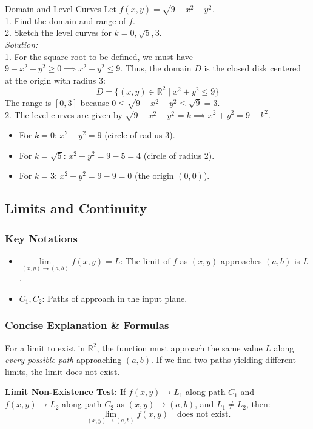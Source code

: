 \documentclass[11pt]{article}
\begin{document}
\begin{examplebox}{Domain and Level Curves}
    Let $f(x,y) = \sqrt{9 - x^2 - y^2}$.\\
    1. Find the domain and range of $f$.\\
    2. Sketch the level curves for $k = 0, \sqrt{5}, 3$.\\
    \textit{Solution:}\\
    1. For the square root to be defined, we must have $9 - x^2 - y^2 \ge 0 \implies x^2 + y^2 \le 9$. Thus, the domain $D$ is the closed disk centered at the origin with radius 3:
    \[ D = \{(x,y) \in \mathbb{R}^2 \mid x^2 + y^2 \le 9\} \]
    The range is $[0, 3]$ because $0 \le \sqrt{9 - x^2 - y^2} \le \sqrt{9} = 3$.\\
    2. The level curves are given by $\sqrt{9 - x^2 - y^2} = k \implies x^2 + y^2 = 9 - k^2$.
    \begin{itemize}
        \item For $k=0$: $x^2 + y^2 = 9$ (circle of radius 3).
        \item For $k=\sqrt{5}$: $x^2 + y^2 = 9 - 5 = 4$ (circle of radius 2).
        \item For $k=3$: $x^2 + y^2 = 9 - 9 = 0$ (the origin $(0,0)$).
    \end{itemize}
\end{examplebox}


\subsection{Limits and Continuity}
\subsubsection*{Key Notations}
\begin{itemize}
    \item $\lim\limits_{(x,y) \to (a,b)} f(x,y) = L$: The limit of $f$ as $(x,y)$ approaches $(a,b)$ is $L$.
    \item $C_1, C_2$: Paths of approach in the input plane.
\end{itemize}

\subsubsection*{Concise Explanation \& Formulas}
For a limit to exist in $\mathbb{R}^2$, the function must approach the same value $L$ along \textit{every possible path} approaching $(a,b)$. If we find two paths yielding different limits, the limit does not exist.
\begin{formulabox}
    \textbf{Limit Non-Existence Test:} If $f(x,y) \to L_1$ along path $C_1$ and $f(x,y) \to L_2$ along path $C_2$ as $(x,y) \to (a,b)$, and $L_1 \neq L_2$, then:
    \[ \lim_{(x,y) \to (a,b)} f(x,y) \quad \text{does not exist.} \]
\end{formulabox}
\end{document}
